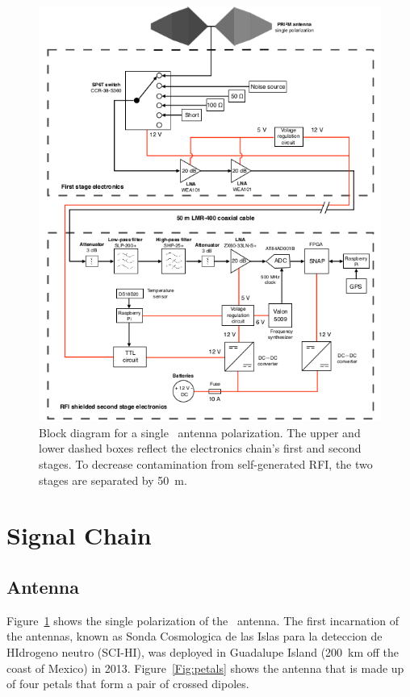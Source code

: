 \begin{figure}
	\centering
	\includegraphics[width=\linewidth]{Figures/PRZIM_block}
	\caption{Block diagram for a single \prizm\ antenna polarization. The upper and lower dashed boxes reflect the electronics chain's first and second stages. To decrease contamination from self-generated RFI, the 
		two stages are separated by \SI{50}{\meter}.}
	\label{Fig:PRZIM_block}
\end{figure}

\section{Signal Chain}

\subsection{Antenna}

Figure~\ref{Fig:PRZIM_block} shows the single polarization of the  \prizm\ antenna. The first incarnation of the antennas, known as Sonda Cosmologica de las Islas para la deteccion de HIdrogeno neutro (SCI-HI), was deployed in Guadalupe Island (\SI{200}{\kilo \meter} off the coast of Mexico) in 2013. Figure~\ref{Fig:petals} shows the antenna that is made up of four petals that form a pair of crossed dipoles.

